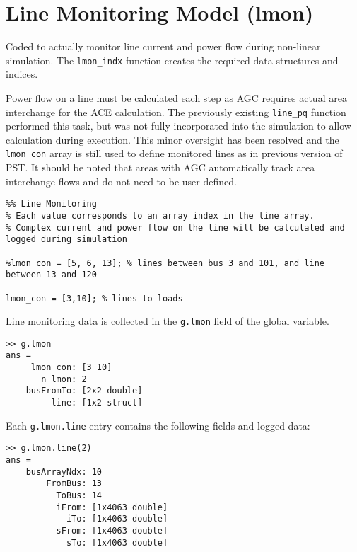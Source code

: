 \pagebreak
\section{Line Monitoring Model (lmon)}  
Coded to actually monitor line current and power flow during non-linear simulation.
The \verb|lmon_indx| function creates the required data structures and indices.

 
Power flow on a line must be calculated each step as AGC requires actual area interchange for the ACE calculation.
The previously existing \verb|line_pq| function performed this task, but was not fully incorporated into the simulation to allow calculation during execution.
This minor oversight has been resolved and the \verb|lmon_con| array is still used to define monitored lines as in previous version of PST.
It should be noted that areas with AGC automatically track area interchange flows and do not need to be user defined.

\begin{verbatim}
%% Line Monitoring
% Each value corresponds to an array index in the line array.
% Complex current and power flow on the line will be calculated and logged during simulation

%lmon_con = [5, 6, 13]; % lines between bus 3 and 101, and line between 13 and 120

lmon_con = [3,10]; % lines to loads
\end{verbatim}

Line monitoring data is collected in the \verb|g.lmon| field of the global variable.

\begin{verbatim}
>> g.lmon
ans = 
     lmon_con: [3 10]
       n_lmon: 2
    busFromTo: [2x2 double]
         line: [1x2 struct]
\end{verbatim}

Each \verb|g.lmon.line| entry contains the following fields and logged data:

\begin{verbatim}
>> g.lmon.line(2)
ans = 
    busArrayNdx: 10
        FromBus: 13
          ToBus: 14
          iFrom: [1x4063 double]
            iTo: [1x4063 double]
          sFrom: [1x4063 double]
            sTo: [1x4063 double]
\end{verbatim}